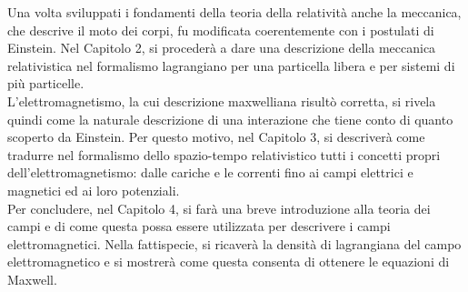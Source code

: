 Una volta sviluppati i fondamenti della teoria della relatività anche la meccanica, che descrive il moto dei corpi, fu modificata coerentemente con i postulati di Einstein. Nel Capitolo 2, si procederà a dare una descrizione della meccanica relativistica nel formalismo lagrangiano per una particella libera e per sistemi di più particelle.\\

L'elettromagnetismo, la cui descrizione maxwelliana risultò corretta, si rivela quindi come la naturale descrizione di una interazione che tiene conto di quanto scoperto da Einstein. Per questo motivo, nel Capitolo 3, si descriverà come tradurre nel formalismo dello spazio-tempo relativistico tutti i concetti propri dell'elettromagnetismo: dalle cariche e le correnti fino ai campi elettrici e magnetici ed ai loro potenziali.\\

Per concludere, nel Capitolo 4, si farà una breve introduzione alla teoria dei campi e di come questa possa essere utilizzata per descrivere i campi elettromagnetici. Nella fattispecie, si ricaverà la densità di lagrangiana del campo elettromagnetico e si mostrerà come questa consenta di ottenere le equazioni di Maxwell.